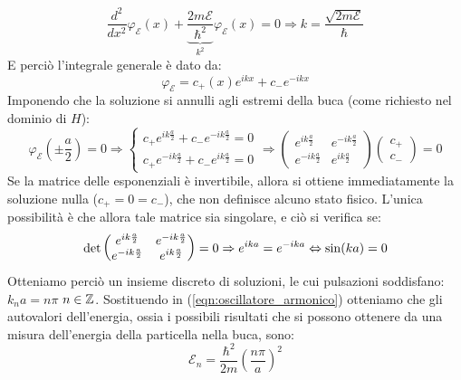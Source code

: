 \documentclass[../../FisicaTeorica.tex]{subfiles}
\begin{document}
\begin{equation}
\frac{d^2}{dx^2}\varphi_\mathcal{E}(x)+\underbrace{\frac{2m\mathcal{E}}{\hbar^2}}_{k^2}\varphi_\mathcal{E}(x)=0 \Rightarrow k = \frac{\sqrt{2m\mathcal{E}}}{\hbar}
\label{eqn:oscillatore_armonico}
\end{equation}
E perciò l'integrale generale è dato da:
\[
\varphi_\mathcal{E}=c_+(x) e^{ikx}+c_- e^{-ikx}
\]
Imponendo che la soluzione si annulli agli estremi della buca (come richiesto nel dominio di $H$):
\begin{equation}
\varphi_\mathcal{E}\left(\pm\frac{a}{2}\right)=0\Rightarrow
\begin{cases}
c_+ e^{ik\frac{a}{2}}+c_- e^{-ik\frac{a}{2}}=0\\
c_+ e^{-ik\frac{a}{2}} + c_- e^{ik\frac{a}{2}} = 0
\end{cases}
\Rightarrow 
\begin{pmatrix}
e^{ik\frac{a}{2}} & e^{-ik\frac{a}{2}}\\
e^{-ik\frac{a}{2}} & e^{ik\frac{a}{2}}
\end{pmatrix}
\begin{pmatrix}
c_+\\
c_-
\end{pmatrix} = 0
\label{eqn:condizioni_contorno_buca}
\end{equation}
Se la matrice delle esponenziali è invertibile, allora si ottiene immediatamente la soluzione nulla ($c_+=0=c_-$), che non definisce alcuno stato fisico. L'unica possibilità è che allora tale matrice sia singolare, e ciò si verifica se:
\begin{equation}
\operatorname{det}\begin{pmatrix}
e^{ik\frac{a}{2}} & e^{-ik\frac{a}{2}}\\
e^{-ik\frac{a}{2}} & e^{ik\frac{a}{2}}
\end{pmatrix}
 = 0 \Rightarrow e^{ika} = e^{-ika}\Leftrightarrow \sin(ka)=0
\label{eqn:matrice_singolare}
\end{equation}
Otteniamo perciò un insieme discreto di soluzioni, le cui pulsazioni soddisfano: $k_n a = n\pi$ $n\in \mathbb{Z}$. Sostituendo in (\ref{eqn:oscillatore_armonico}) otteniamo che gli autovalori dell'energia, ossia i possibili risultati che si possono ottenere da una misura dell'energia della particella nella buca, sono:
\begin{equation}
    \mathcal{E}_n = \frac{\hbar^2}{2m}\left(\frac{n\pi}{a}\right)^2
    \label{eqn:autovalori_buca}
\end{equation}
\end{document}
